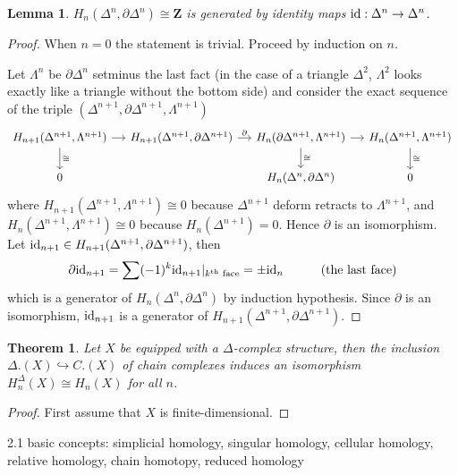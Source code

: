 \documentclass[11pt]{article}
\theoremstyle{definition}
\theoremstyle{plain}
\newtheorem*{lemma}{Lemma}
\newtheorem{theorem}{Theorem}[section]
\theoremstyle{remark}
\newcommand{\id}{\textup{id}}
\newcommand{\Z}{\mathbf{Z}}
\begin{document}
\begin{lemma}
$H_n(\Delta^n,\partial\Delta^n)\cong\Z$ is generated by identity maps $\id:\Delta^n\to\Delta^n$.
\end{lemma}
\begin{proof}
When $n=0$ the statement is trivial. Proceed by induction on $n$.\medbreak

Let $\Lambda^n$ be $\partial\Delta^n$ setminus the last fact (in the case of a triangle $\Delta^2$, $\Lambda^2$ looks exactly like a triangle without the bottom side) and consider the exact sequence of the triple $(\Delta^{n+1},\partial\Delta^{n+1},\Lambda^{n+1})$
\[\begin{tikzcd}[column sep=small]
H_{n+1}(\Delta^{n+1},\Lambda^{n+1})\arrow{d}{\cong}\arrow[r]&H_{n+1}(\Delta^{n+1},\partial\Delta^{n+1})\arrow{r}{\partial}&H_n(\partial\Delta^{n+1},\Lambda^{n+1})\arrow{d}{\cong}\arrow[r]&H_n(\Delta^{n+1},\Lambda^{n+1})\arrow{d}{\cong}\\
0&&H_n(\Delta^n,\partial\Delta^n)&0
\end{tikzcd}\]
where $H_{n+1}(\Delta^{n+1},\Lambda^{n+1})\cong0$ because $\Delta^{n+1}$ deform retracts to $\Lambda^{n+1}$, and $H_n(\Delta^{n+1},\Lambda^{n+1})\cong0$ because $H_n(\Delta^{n+1})=0$. Hence $\partial$ is an isomorphism. Let $\id_{n+1}\in H_{n+1}(\Delta^{n+1},\partial\Delta^{n+1})$, then
\begin{align*}
\partial \id_{n+1}=\sum(-1)^k\id_{n+1}|_{k^{\textrm{th}}\textrm{ face}}=\pm\id_n\quad\quad\quad\textrm{(the last face)}
\end{align*}
which is a generator of $H_n(\Delta^n,\partial\Delta^n)$ by induction hypothesis. Since $\partial$ is an isomorphism, $\id_{n+1}$ is a generator of $H_{n+1}(\Delta^{n+1},\partial\Delta^{n+1})$.
\end{proof}

\begin{theorem}
Let $X$ be equipped with a $\Delta$-complex structure, then the inclusion $\Delta.(X)\hookrightarrow C.(X)$ of chain complexes induces an isomorphism $H_n^\Delta(X)\cong H_n(X)$ for all $n$.
\end{theorem}
\begin{proof}
First assume that $X$ is finite-dimensional.
\end{proof}

\bigbreak

2.1 basic concepts: simplicial homology, singular homology, cellular homology, relative homology, chain homotopy, reduced homology
\end{document}
